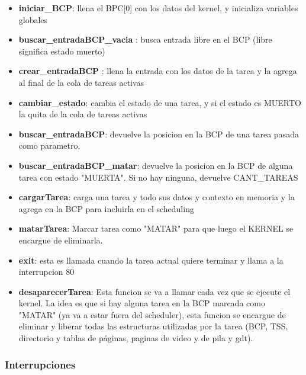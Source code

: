 \documentclass[11pt, a4paper]{article}
\begin{document}
\begin{itemize}


\item \textbf{iniciar\_BCP}: llena el BPC[0] con los datos del kernel, y inicializa variables globales


\item \textbf{buscar\_entradaBCP\_vacia }: busca entrada libre en el BCP (libre significa estado muerto)

\item \textbf{crear\_entradaBCP }: llena la entrada con los datos de la tarea y la agrega al final de la cola de tareas activas

\item \textbf{cambiar\_estado}: cambia el estado de una tarea, y si el estado es MUERTO la quita de la cola de tareas activas

\item \textbf{buscar\_entradaBCP}: devuelve la posicion en la BCP de una tarea pasada como parametro.

\item \textbf{buscar\_entradaBCP\_matar}: devuelve la posicion en la BCP de alguna tarea con estado "MUERTA". Si no hay ninguna, devuelve CANT\_TAREAS


\item \textbf{cargarTarea}: carga una tarea y todo sus datos y contexto en memoria y la agrega en la BCP para incluirla en el scheduling


\item \textbf{matarTarea}: Marcar tarea como "MATAR" para que luego el KERNEL se encargue de eliminarla. 

\item \textbf{exit}:  esta es llamada cuando la tarea actual quiere terminar y llama a la interrupcion 80


\item \textbf{desaparecerTarea}: Esta funcion se va a llamar cada vez que se ejecute el kernel. La idea es que si hay alguna tarea en la BCP marcada como "MATAR" (ya va a estar fuera del scheduler), esta funcion se encargue de eliminar y liberar todas las estructuras utilizadas por la tarea (BCP, TSS, directorio y tablas de páginas, paginas de video y de pila y gdt).



\end{itemize}
\subsubsection{Interrupciones}
\end{document}
